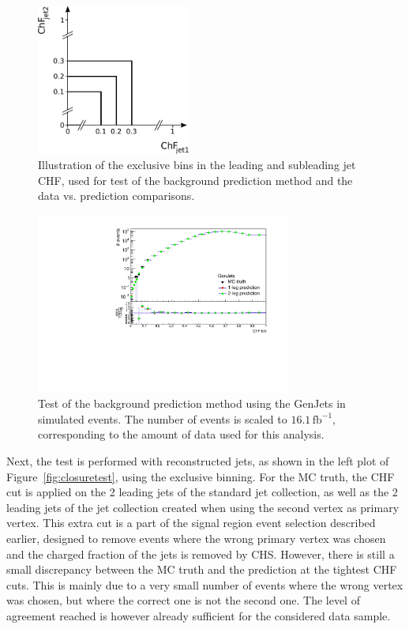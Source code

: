 \begin{figure}[ht]
  \centering
  \includegraphics[width=0.45\textwidth]{figures/exclusive_binning.pdf}\hfill%
  \caption{Illustration of the exclusive bins in the leading and subleading jet CHF, used for test of the background prediction method and the data vs. prediction comparisons.}
  \label{fig:excl_binning}
\end{figure}

\begin{figure}[ht]
  \centering
  \includegraphics[width=0.75\textwidth]{figures/closure_test_QCD_GenJets_exclusive_correct.pdf}\hfill%
  \caption{Test of the background prediction method using the GenJets in simulated events. The number of events is scaled to $16.1\, \mathrm{fb}^{-1}$, corresponding to the amount of data used for this analysis.}
  \label{fig:closuretest_GenJets}
\end{figure}

Next, the test is performed with reconstructed jets, as shown in the left plot of Figure~\ref{fig:closuretest}, using the exclusive binning. For the MC truth, the CHF cut is applied on the 2 leading jets of the standard jet collection, as well as the 2 leading jets of the jet collection created when using the second vertex as primary vertex. This extra cut is a part of the signal region event selection described earlier, designed to remove events where the wrong primary vertex was chosen and the charged fraction of the jets is removed by \ac{CHS}. However, there is still a small discrepancy between the MC truth and the prediction at the tightest CHF cuts. This is mainly due to a very small number of events where the wrong vertex was chosen, but where the correct one is not the second one. The level of agreement reached is however already sufficient for the considered data sample.

